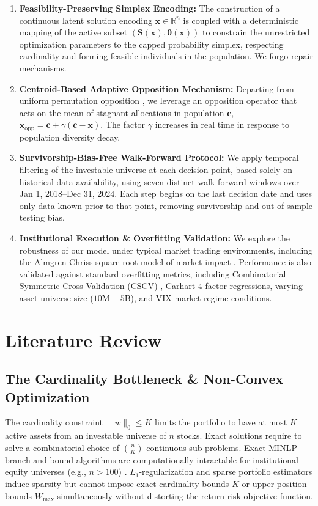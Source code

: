 \documentclass[11pt,a4paper]{article}
\begin{document}
\begin{enumerate}

\item \textbf{Feasibility-Preserving Simplex Encoding:} The construction of a continuous latent solution encoding $\mathbf{x} \in \mathbb{R}^n$ is coupled with a deterministic mapping of the active subset $(\mathbf{S}(\mathbf{x}), \boldsymbol{\theta}(\mathbf{x}))$ to constrain the unrestricted optimization parameters to the capped probability simplex, respecting cardinality and forming feasible individuals in the population. We forgo repair mechanisms.
 \item \textbf{Centroid-Based Adaptive Opposition Mechanism:} Departing from uniform permutation opposition \cite{tizhoosh2005}, we leverage an opposition operator that acts on the mean of stagnant allocations in population $\mathbf{c}$, $\mathbf{x}_{\text{opp}} = \mathbf{c} + \gamma(\mathbf{c} - \mathbf{x})$. The factor $\gamma$ increases in real time in response to population diversity decay.
 \item \textbf{Survivorship-Bias-Free Walk-Forward Protocol:} We apply temporal filtering of the investable universe at each decision point, based solely on historical data availability, using seven distinct walk-forward windows over Jan 1, 2018--Dec 31, 2024. Each step begins on the last decision date and uses only data known prior to that point, removing survivorship and out-of-sample testing bias.
 \item \textbf{Institutional Execution \& Overfitting Validation:} We explore the robustness of our model under typical market trading environments, including the Almgren-Chriss square-root model of market impact \cite{horst2024}. Performance is also validated against standard overfitting metrics, including Combinatorial Symmetric Cross-Validation (CSCV) \cite{bailey2017}, Carhart 4-factor regressions, varying asset universe size ($10\text{M}-5\text{B}$), and VIX market regime conditions.

\end{enumerate}

\section{Literature Review}

\subsection{The Cardinality Bottleneck \& Non-Convex Optimization}
The cardinality constraint $\|w\|_0\le K$ limits the portfolio to have at most $K$ active assets from an investable universe of $n$ stocks. Exact solutions require \cite{woodside2011} to solve a combinatorial choice of $\binom{n}{K}$ continuous sub-problems. Exact MINLP branch-and-bound algorithms are computationally intractable for institutional equity universes (e.g., $n>100$) \cite{gao2013}. $L_1$-regularization and sparse portfolio estimators \cite{brodie2009} induce sparsity but cannot impose exact cardinality bounds $K$ or upper position bounds $W_{\max}$ simultaneously without distorting the return-risk objective function.
\end{document}
